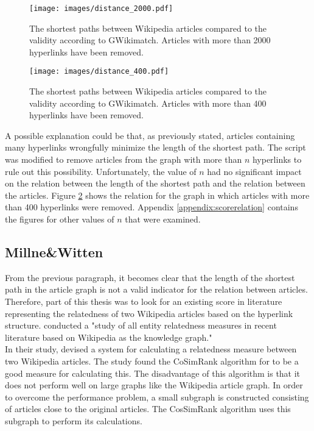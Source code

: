 \begin{figure}[h]
\texttt{[image: images/distance\_2000.pdf]}
\caption{The shortest paths between Wikipedia articles compared to the validity according to GWikimatch. Articles with more than 2000 hyperlinks have been removed. }
\label{imgDistance2000}
\end{figure}

\begin{figure}[h]
\texttt{[image: images/distance\_400.pdf]}
\caption{The shortest paths between Wikipedia articles compared to the validity according to GWikimatch. Articles with more than 400 hyperlinks have been removed. }
\label{imgDistance400}
\end{figure}

A possible explanation could be that, as previously stated, articles containing many hyperlinks wrongfully minimize the length of the shortest path. The script was modified to remove articles from the graph with more than $n$ hyperlinks to rule out this possibility. Unfortunately, the value of $n$ had no significant impact on the relation between the length of the shortest path and the relation between the articles. Figure \ref{imgDistance400} shows the relation for the graph in which articles with more than 400 hyperlinks were removed. Appendix \ref{appendix:scorerelation} contains the figures for other values of $n$ that were examined. 

\subsection{Millne\&Witten}
\label{secHyperlinkDistance}
From the previous paragraph, it becomes clear that the length of the shortest path in the article graph is not a valid indicator for the relation between articles. Therefore, part of this thesis was to look for an existing score in literature representing the relatedness of two Wikipedia articles based on the hyperlink structure. \citet{Ponza2017} conducted a "study of all entity relatedness measures in recent literature based on Wikipedia as the knowledge graph." \\

In their study, \citet{Ponza2017} devised a system for calculating a relatedness measure between two Wikipedia articles. The study found the  CoSimRank algorithm for \citet{cosimrank} to be a good measure for calculating this. The disadvantage of this algorithm is that it does not perform well on large graphs like the Wikipedia article graph. In order to overcome the performance problem, a small subgraph is constructed consisting of articles close to the original articles. The CosSimRank algorithm uses this subgraph to perform its calculations. \\

